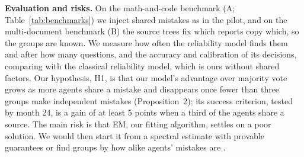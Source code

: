 \documentclass[12pt,letterpaper]{article}
\newcommand{\hd}[1]{\ifhmode\par\fi\addvspace{1pt}\noindent\textbf{#1}\hspace{0.35em}}
\begin{document}
\hd{Evaluation and risks.} On the math-and-code benchmark (A; Table~\ref{tab:benchmarks}) we inject shared mistakes as in the pilot, and on the multi-document benchmark (B) the source trees fix which reports copy which, so the groups are known. We measure how often the reliability model finds them and after how many questions, and the accuracy and calibration of its decisions, comparing with the classical reliability model, which is ours without shared factors. Our hypothesis, H1, is that our model's advantage over majority vote grows as more agents share a mistake and disappears once fewer than three groups make independent mistakes (Proposition~2); its success criterion, tested by month 24, is a gain of at least 5 points when a third of the agents share a source. The main risk is that EM, our fitting algorithm, settles on a poor solution. We would then start it from a spectral estimate with provable guarantees \citep{zhang2016spectral} or find groups by how alike agents' mistakes are \citep{goel2025great}.
\end{document}
